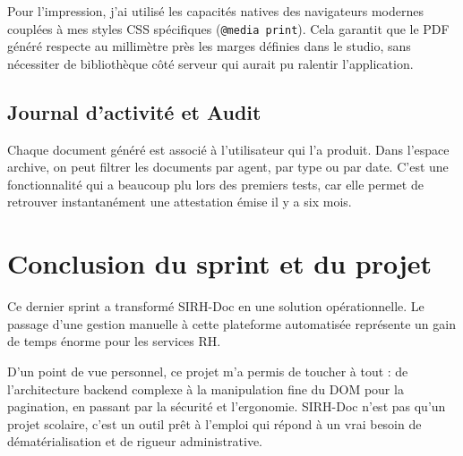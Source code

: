 Pour l'impression, j'ai utilisé les capacités natives des navigateurs modernes couplées à mes styles CSS spécifiques (\texttt{@media print}). Cela garantit que le PDF généré respecte au millimètre près les marges définies dans le studio, sans nécessiter de bibliothèque côté serveur qui aurait pu ralentir l'application.

\subsection{Journal d'activité et Audit}

Chaque document généré est associé à l'utilisateur qui l'a produit. Dans l'espace archive, on peut filtrer les documents par agent, par type ou par date. C'est une fonctionnalité qui a beaucoup plu lors des premiers tests, car elle permet de retrouver instantanément une attestation émise il y a six mois.

\section{Conclusion du sprint et du projet}

Ce dernier sprint a transformé SIRH-Doc en une solution opérationnelle. Le passage d'une gestion manuelle à cette plateforme automatisée représente un gain de temps énorme pour les services RH. 

D'un point de vue personnel, ce projet m'a permis de toucher à tout : de l'architecture backend complexe à la manipulation fine du DOM pour la pagination, en passant par la sécurité et l'ergonomie. SIRH-Doc n'est pas qu'un projet scolaire, c'est un outil prêt à l'emploi qui répond à un vrai besoin de dématérialisation et de rigueur administrative.
